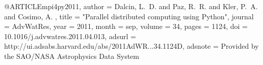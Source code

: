 
@ARTICLE{mpi4py2011,
   author = {{Dalcin}, L.~D. and {Paz}, R.~R. and {Kler}, P.~A. and {Cosimo}, A.
	},
    title = "{Parallel distributed computing using Python}",
  journal = {AdvWatRes},
     year = 2011,
    month = sep,
   volume = 34,
    pages = {1124},
      doi = {10.1016/j.advwatres.2011.04.013},
   adsurl = {http://ui.adsabs.harvard.edu/abs/2011AdWR...34.1124D},
  adsnote = {Provided by the SAO/NASA Astrophysics Data System}
}
